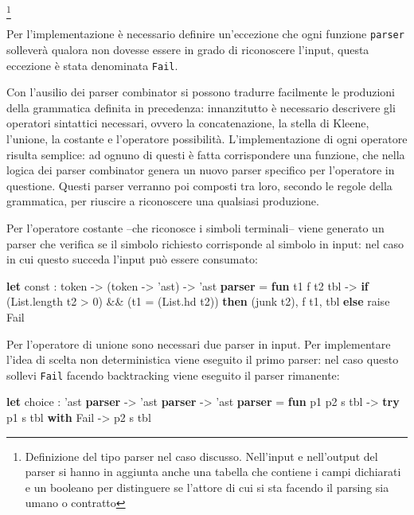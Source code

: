 \documentclass[]{article}
\newenvironment{Shaded}{}{}
\newcommand{\DataTypeTok}[1]{\textcolor[rgb]{0.56,0.13,0.00}{#1}}
\newcommand{\DecValTok}[1]{\textcolor[rgb]{0.25,0.63,0.44}{#1}}
\newcommand{\KeywordTok}[1]{\textcolor[rgb]{0.00,0.44,0.13}{\textbf{#1}}}
\newcommand{\NormalTok}[1]{#1}
\begin{document}
\footnote{Definizione del tipo parser nel caso discusso. Nell'input e
  nell'output del parser si hanno in aggiunta anche una tabella che
  contiene i campi dichiarati e un booleano per distinguere se l'attore
  di cui si sta facendo il parsing sia umano o contratto}

Per l'implementazione è necessario definire un'eccezione che ogni
funzione \texttt{parser} solleverà qualora non dovesse essere in grado
di riconoscere l'input, questa eccezione è stata denominata
\texttt{Fail}.

Con l'ausilio dei parser combinator si possono tradurre facilmente le
produzioni della grammatica definita in precedenza: innanzitutto è
necessario descrivere gli operatori sintattici necessari, ovvero la
concatenazione, la stella di Kleene, l'unione, la costante e l'operatore
possibilità. L'implementazione di ogni operatore risulta semplice: ad
ognuno di questi è fatta corrispondere una funzione, che nella logica
dei parser combinator genera un nuovo parser specifico per l'operatore
in questione. Questi parser verranno poi composti tra loro, secondo le
regole della grammatica, per riuscire a riconoscere una qualsiasi
produzione.

Per l'operatore costante --che riconosce i simboli terminali-- viene
generato un parser che verifica se il simbolo richiesto corrisponde al
simbolo in input: nel caso in cui questo succeda l'input può essere
consumato:

\begin{Shaded}
\begin{Highlighting}[]
\KeywordTok{let}\NormalTok{ const : token -> (token -> 'ast) -> 'ast }\KeywordTok{parser}\NormalTok{ =}
 \KeywordTok{fun}\NormalTok{ t1 f t2 tbl ->}
  \KeywordTok{if}\NormalTok{ (}\DataTypeTok{List}\NormalTok{.length t2 > }\DecValTok{0}\NormalTok{) && (t1 = (}\DataTypeTok{List}\NormalTok{.hd t2)) }\KeywordTok{then}
\NormalTok{   (junk t2), f t1, tbl}
  \KeywordTok{else}
   \DataTypeTok{raise}\NormalTok{ Fail}
\end{Highlighting}
\end{Shaded}

Per l'operatore di unione sono necessari due parser in input. Per
implementare l'idea di scelta non deterministica viene eseguito il primo
parser: nel caso questo sollevi \texttt{Fail} facendo backtracking viene
eseguito il parser rimanente:

\begin{Shaded}
\begin{Highlighting}[]
\KeywordTok{let}\NormalTok{ choice : 'ast }\KeywordTok{parser}\NormalTok{ -> 'ast }\KeywordTok{parser}\NormalTok{ -> 'ast }\KeywordTok{parser}
\NormalTok{= }\KeywordTok{fun}\NormalTok{ p1 p2 s tbl ->}
 \KeywordTok{try}\NormalTok{ p1 s tbl }\KeywordTok{with}\NormalTok{ Fail -> p2 s tbl}
\end{Highlighting}
\end{Shaded}
\end{document}
